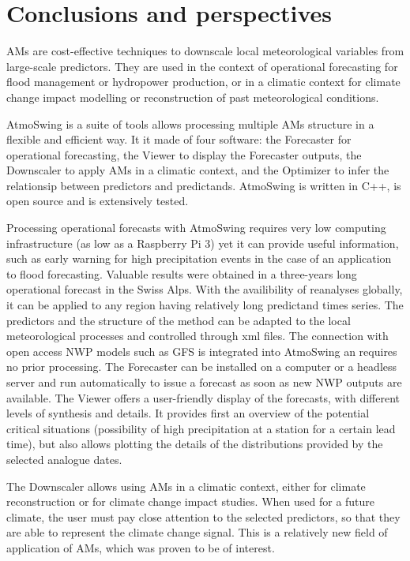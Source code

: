 \documentclass[review]{elsarticle}
\begin{document}
\section{Conclusions and perspectives}
\label{sec:conclusions}

AMs are cost-effective techniques to downscale local meteorological variables from large-scale predictors. They are used in the context of operational forecasting for flood management or hydropower production, or in a climatic context for climate change impact modelling or reconstruction of past meteorological conditions.

AtmoSwing is a suite of tools allows processing multiple AMs structure in a flexible and efficient way. It it made of four software: the Forecaster for operational forecasting, the Viewer to display the Forecaster outputs, the Downscaler to apply AMs in a climatic context, and the Optimizer to infer the relationsip between predictors and predictands. AtmoSwing is written in C++, is open source and is extensively tested.

Processing operational forecasts with AtmoSwing requires very low computing infrastructure (as low as a Raspberry Pi 3) yet it can provide useful information, such as early warning for high precipitation events in the case of an application to flood forecasting. Valuable results were obtained in a three-years long operational forecast in the Swiss Alps. With the availibility of reanalyses globally, it can be applied to any region having relatively long predictand times series. The predictors and the structure of the method can be adapted to the local meteorological processes and controlled through xml files. The connection with open access NWP models such as GFS is integrated into AtmoSwing an requires no prior processing. The Forecaster can be installed on a computer or a headless server and run automatically to issue a forecast as soon as new NWP outputs are available. The Viewer offers a user-friendly display of the forecasts, with different levels of synthesis and details. It provides first an overview of the potential critical situations (possibility of high precipitation at a station for a certain lead time), but also allows plotting the details of the distributions provided by the selected analogue dates.

The Downscaler allows using AMs in a climatic context, either for climate reconstruction or for climate change impact studies. When used for a future climate, the user must pay close attention to the selected predictors, so that they are able to represent the climate change signal. This is a relatively new field of application of AMs, which was proven to be of interest.
\end{document}
